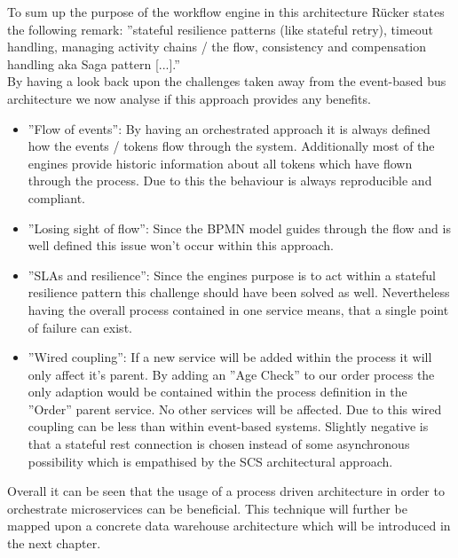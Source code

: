 To sum up the purpose of the workflow engine in this architecture Rücker states the following remark: ''stateful resilience patterns (like stateful retry), timeout handling, managing activity chains / the flow, consistency and compensation handling aka Saga pattern [...].'' \cite{orchestrationMicroServices}\newline
\\
By having a look back upon the challenges taken away from the event-based bus architecture we now analyse if this approach provides any benefits. 
\begin{itemize}
    \item ''Flow of events'': By having an orchestrated approach it is always defined how the events / tokens flow through the system. Additionally most of the engines provide historic information about all tokens which have flown through the process. Due to this the behaviour is always reproducible and compliant. 
    \item ''Losing sight of flow'': Since the BPMN model guides through the flow and is well defined this issue won't occur within this approach.
    \item ''SLAs and resilience'': Since the engines purpose is to act within a stateful resilience pattern this challenge should have been solved as well. Nevertheless having the overall process contained in one service means, that a single point of failure can exist. 
    \item ''Wired coupling'': If a new service will be added within the process it will only affect it's parent. By adding an ''Age Check'' to our order process the only adaption would be contained within the process definition in the ''Order'' parent service. No other services will be affected. Due to this wired coupling can be less than within event-based systems. Slightly negative is that a stateful \acrshort{rest} connection is chosen instead of some asynchronous possibility which is empathised by the SCS architectural approach. 
\end{itemize}
Overall it can be seen that the usage of a process driven architecture in order to orchestrate microservices can be beneficial. This technique will further be mapped upon a concrete data warehouse architecture which will be introduced in the next chapter. 
